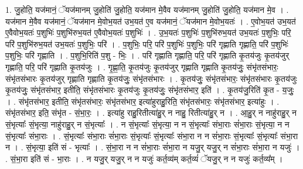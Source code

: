 \documentclass[17pt]{extarticle}
\begin{document}
1. जु॒होति॒ यज॑मानं॒ ॅयज॑मानम् जु॒होति॑ जु॒होति॒ यज॑मान मे॒वैव यज॑मानम् जु॒होति॑ जु॒होति॒ यज॑मान मे॒व । . यज॑मान मे॒वैव यज॑मानं॒ ॅयज॑मान मे॒वोभ॒यत॑ उभ॒यत॑ ए॒व यज॑मानं॒ ॅयज॑मान मे॒वोभ॒यतः॑ । . ए॒वोभ॒यत॑ उभ॒यत॑ ए॒वैवोभ॒यतः॑ प॒शुभिः॑ प॒शुभि॑रुभ॒यत॑ ए॒वैवोभ॒यतः॑ प॒शुभिः॑ । . उ॒भ॒यतः॑ प॒शुभिः॑ प॒शुभि॑रुभ॒यत॑ उभ॒यतः॑ प॒शुभिः॒ परि॒ परि॑ प॒शुभि॑रुभ॒यत॑ उभ॒यतः॑ प॒शुभिः॒ परि॑ । . प॒शुभिः॒ परि॒ परि॑ प॒शुभिः॑ प॒शुभिः॒ परि॑ गृह्णाति गृह्णाति॒ परि॑ प॒शुभिः॑ प॒शुभिः॒ परि॑ गृह्णाति । . प॒शुभि॒रिति॑ प॒शु - भिः॒ । . परि॑ गृह्णाति गृह्णाति॒ परि॒ परि॑ गृह्णाति कृ॒तय॑जुः कृ॒तय॑जुर् गृह्णाति॒ परि॒ परि॑ गृह्णाति कृ॒तय॑जुः । . गृ॒ह्णा॒ति॒ कृ॒तय॑जुः कृ॒तय॑जुर् गृह्णाति गृह्णाति कृ॒तय॑जुः॒ संभृ॑तसंभारः॒ संभृ॑तसंभारः कृ॒तय॑जुर् गृह्णाति गृह्णाति कृ॒तय॑जुः॒ संभृ॑तसंभारः । . कृ॒तय॑जुः॒ संभृ॑तसंभारः॒ संभृ॑तसंभारः कृ॒तय॑जुः कृ॒तय॑जुः॒ संभृ॑तसंभार॒ इतीति॒ संभृ॑तसंभारः कृ॒तय॑जुः कृ॒तय॑जुः॒ संभृ॑तसंभार॒ इति॑ । . कृ॒तय॑जु॒रिति॑ कृ॒त - य॒जुः॒ । . संभृ॑तसंभार॒ इतीति॒ संभृ॑तसंभारः॒ संभृ॑तसंभार॒ इत्या॑हुराहु॒रिति॒ संभृ॑तसंभारः॒ संभृ॑तसंभार॒ इत्या॑हुः । . संभृ॑तसंभार॒ इति॒ संभृ॑त - सं॒भा॒रः॒ । . इत्या॑हु राहु॒रितीत्या॑हु॒र् न नाहु॒ रितीत्या॑हु॒र् न । . आ॒हु॒र् न नाहु॑राहु॒र् न सं॒भृत्याः᳚ सं॒भृत्या॒ नाहु॑राहु॒र् न सं॒भृत्याः᳚ । . न सं॒भृत्याः᳚ सं॒भृत्या॒ न न सं॒भृत्याः᳚ संभा॒राः सं॑भा॒राः सं॒भृत्या॒ न न सं॒भृत्याः᳚ संभा॒राः । . सं॒भृत्याः᳚ संभा॒राः सं॑भा॒राः सं॒भृत्याः᳚ सं॒भृत्याः᳚ संभा॒रा न न सं॑भा॒राः सं॒भृत्याः᳚ सं॒भृत्याः᳚ संभा॒रा न । . सं॒भृत्या॒ इति॑ सं - भृत्याः᳚ । . सं॒भा॒रा न न सं॑भा॒राः सं॑भा॒रा न यजु॒र् यजु॒र् न सं॑भा॒राः सं॑भा॒रा न यजुः॑ । . सं॒भा॒रा इति॑ सं - भा॒राः । . न यजु॒र् यजु॒र् न न यजुः॑ कर्त॒व्य॑म् कर्त॒व्यं॑ ॅयजु॒र् न न यजुः॑ कर्त॒व्य᳚म् । \newline
\end{document}
